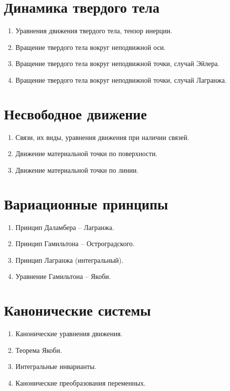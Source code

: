\documentclass[landscape,10pt]{notes}
\begin{document}
\begin{multicols}{2}
  \section{Динамика твердого тела}
  \begin{enumerate}[resume]
    \item Уравнения движения твердого тела, тензор инерции.
    \item Вращение твердого тела вокруг неподвижной оси.
    \item Вращение твердого тела вокруг неподвижной точки, случай Эйлера.
    \item Вращение твердого тела вокруг неподвижной точки, случай Лагранжа.
  \end{enumerate}
  \section{Несвободное движение}

  \begin{enumerate}[resume]
    \item Связи, их виды, уравнения движения при наличии связей.
    \item Движение материальной точки по поверхности.
    \item Движение материальной точки по линии.
  \end{enumerate}

  \section{Вариационные принципы}
  \begin{enumerate}[resume]
    \item Принцип Даламбера – Лагранжа.
    \item Принцип Гамильтона – Остроградского.
    \item Принцип Лагранжа (интегральный).
    \item Уравнение Гамильтона – Якоби.
  \end{enumerate}

  \section{Канонические системы}
  \begin{enumerate}[resume]
    \item Канонические уравнения движения.
    \item Теорема Якоби.
    \item Интегральные инварианты.
    \item Канонические преобразования переменных.
  \end{enumerate}
\end{multicols}
\end{document}
